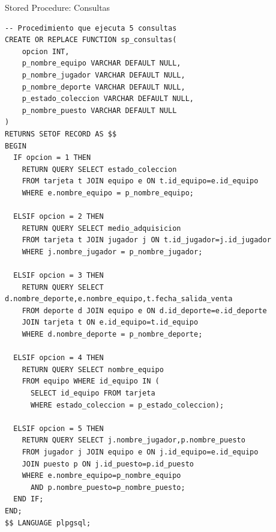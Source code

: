 \documentclass{beamer}
\begin{document}
\begin{frame}[fragile]{Stored Procedure: Consultas}
\begin{lstlisting}
-- Procedimiento que ejecuta 5 consultas
CREATE OR REPLACE FUNCTION sp_consultas(
    opcion INT,
    p_nombre_equipo VARCHAR DEFAULT NULL,
    p_nombre_jugador VARCHAR DEFAULT NULL,
    p_nombre_deporte VARCHAR DEFAULT NULL,
    p_estado_coleccion VARCHAR DEFAULT NULL,
    p_nombre_puesto VARCHAR DEFAULT NULL
)
RETURNS SETOF RECORD AS $$
BEGIN
  IF opcion = 1 THEN
    RETURN QUERY SELECT estado_coleccion
    FROM tarjeta t JOIN equipo e ON t.id_equipo=e.id_equipo
    WHERE e.nombre_equipo = p_nombre_equipo;

  ELSIF opcion = 2 THEN
    RETURN QUERY SELECT medio_adquisicion
    FROM tarjeta t JOIN jugador j ON t.id_jugador=j.id_jugador
    WHERE j.nombre_jugador = p_nombre_jugador;

  ELSIF opcion = 3 THEN
    RETURN QUERY SELECT d.nombre_deporte,e.nombre_equipo,t.fecha_salida_venta
    FROM deporte d JOIN equipo e ON d.id_deporte=e.id_deporte
    JOIN tarjeta t ON e.id_equipo=t.id_equipo
    WHERE d.nombre_deporte = p_nombre_deporte;

  ELSIF opcion = 4 THEN
    RETURN QUERY SELECT nombre_equipo
    FROM equipo WHERE id_equipo IN (
      SELECT id_equipo FROM tarjeta
      WHERE estado_coleccion = p_estado_coleccion);

  ELSIF opcion = 5 THEN
    RETURN QUERY SELECT j.nombre_jugador,p.nombre_puesto
    FROM jugador j JOIN equipo e ON j.id_equipo=e.id_equipo
    JOIN puesto p ON j.id_puesto=p.id_puesto
    WHERE e.nombre_equipo=p_nombre_equipo
      AND p.nombre_puesto=p_nombre_puesto;
  END IF;
END;
$$ LANGUAGE plpgsql;
\end{lstlisting}
\end{frame}
\end{document}
